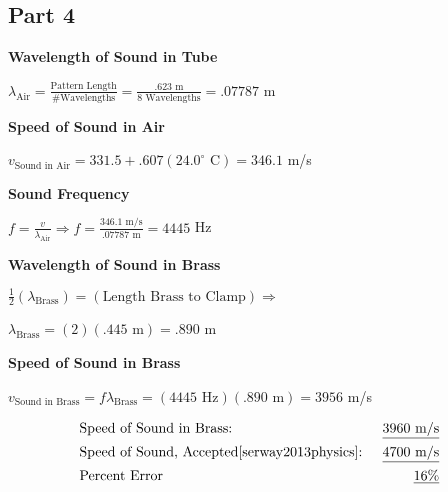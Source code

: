 \documentclass[twocolumn,english]{IEEEtran}
\theoremstyle{plain}
\theoremstyle{plain}
\begin{document}
\subsection*{Part 4}
\textbf{Wavelength of Sound in Tube}

$\lambda_{\text{Air}} = \frac{\text{Pattern Length}}{\text{\# Wavelengths}} = \frac{.623\text{ m}}{8\text{ Wavelengths}} = .07787$ m

\textbf{Speed of Sound in Air}

$v_{\text{Sound in Air}} = 331.5 + .607(24.0^{\circ}\text{ C}) = 346.1$ m/s

\textbf{Sound Frequency}

$f =\frac{v}{\lambda_{\text{Air}}}\Rightarrow f=\frac{346.1\text{ m/s}}{.07787\text{ m}} =4445$ Hz

\textbf{Wavelength of Sound in Brass}

$\frac{1}{2}(\lambda_{\text{Brass}})=(\text{Length Brass to Clamp}) \Rightarrow$

$\lambda_{\text{Brass}} = (2)(.445\text{ m}) = .890$ m

\textbf{Speed of Sound in Brass}

$v_{\text{Sound in Brass}} = f\lambda_{\text{Brass}} = (4445\text{ Hz})(.890\text{ m}) = 3956$ m/s


\noindent\hrulefill
\begin{align*}
 &\text{Speed of Sound in Brass:}				&\text{\underline{$3960$ m/s}} \\
 &\text{Speed of Sound, Accepted\cite{serway2013physics}: }	&\text{\underline{$4700$ m/s}} \\ %
 &\text{Percent Error}						&\text{\underline{$16\%$}}
\end{align*}
\noindent\hrulefill
\end{document}
